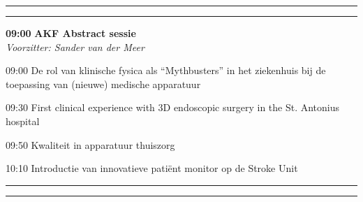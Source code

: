\documentclass[a4paper,10pt]{report}
\begin{document}
\begin{multicols*}{3}
\columnbreak

\hrule\vspace{2mm}
\vspace{2mm}\hrule\strut

\begin{packed_enum}
\item[\textbf{09:00}] \textbf{AKF Abstract sessie}\\\textit{Voorzitter: Sander van der Meer}
\item[09:00] De rol van klinische fysica als ``Mythbusters'' in het zieken\-huis bij de toe\-passing van (nieuwe) medische appara\-tuur
\item[09:30] First clinical experience with 3D endoscopic surgery in the St. Antonius hospital
\item[09:50] Kwaliteit in apparatuur thuiszorg
\item[10:10] Introductie van innovatieve patiënt monitor op de Stroke Unit
\end{packed_enum} %

\vfill


\hrule\vspace{2mm}
\vspace{2mm}\hrule


\end{multicols*}
\end{document}
